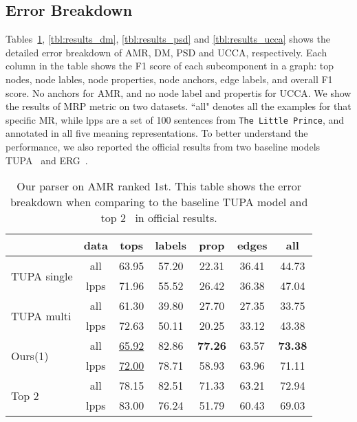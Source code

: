 \subsection{Error Breakdown}
\label{ssec:error_breakdown}
Tables~\ref{tbl:results_amr}, \ref{tbl:results_dm},
\ref{tbl:results_psd} and \ref{tbl:results_ucca} shows the detailed
error breakdown of AMR, DM, PSD and UCCA, respectively. Each column in
the table shows the F1 score of each subcomponent in a graph: top
nodes, node lables, node properties, node anchors, edge labels, and
overall F1 score. No anchors for AMR, and no node label and propertis
for UCCA. We show the results of MRP metric on two datasets. ``all"
denotes all the examples for that specific MR, while lpps are a set of
100 sentences from \texttt{The Little Prince}, and annotated in all five
meaning representations. To better understand the performance, we also
reported the official results from two baseline models
TUPA~\cite{Her:Arv:19} and ERG~\cite{Oep:Fli:19}.

\begin{table}[!tbp]
\caption{\label{tbl:results_amr} Our parser on AMR ranked 1st. This table shows the error breakdown when comparing to the baseline TUPA model and top 2~\cite{Che:Dou:Xu:19} in official results.}
\begin{center}
\setlength{\tabcolsep}{3pt}
\begin{tabular}{lcccccc}
\toprule
\hline
                          & data & tops              & labels & prop  & edges & all   \\ \hline
\multirow{2}{*}{ \parbox{1cm}{TUPA
single} }                 & all  & 63.95             & 57.20  & 22.31 & 36.41 & 44.73 \\
                          & lpps & 71.96             & 55.52  & 26.42 & 36.38 & 47.04 \\ \hline
\multirow{2}{*}{ \parbox{1cm}{TUPA
multi} }                  & all  & 61.30             & 39.80  & 27.70 & 27.35 & 33.75 \\
                          & lpps & 72.63             & 50.11  & 20.25 & 33.12 & 43.38 \\ \hline
\multirow{2}{*}{ Ours(1)} & all  & \underline{65.92} & 82.86  & {\bf 77.26} & 63.57 & {\bf 73.38} \\
                          & lpps & \underline{72.00} & 78.71  & 58.93 & 63.96 & 71.11 \\ \hline
\multirow{2}{*}{ Top 2}  & all  & 78.15             & 82.51  & 71.33 & 63.21 & 72.94 \\
                          & lpps & 83.00             & 76.24  & 51.79 & 60.43 & 69.03 \\ \hline
\bottomrule
\end{tabular}
\end{center}
\end{table}

